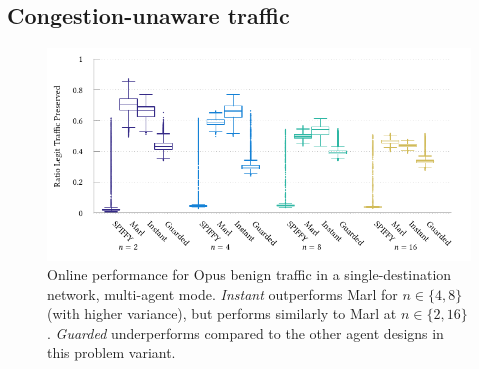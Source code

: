 \subsection{Congestion-unaware traffic}
%	
%	
\begin{figure}
	\centering
	\includegraphics[width=\linewidth]{plots/marl/tnsm-udp-box-separate-thesis}
	\caption[Online performance for Opus benign traffic in a single-destination network, multi-agent mode.]{
		Online performance for Opus benign traffic in a single-destination network, multi-agent mode.
		\emph{Instant} outperforms Marl for $n \in \{4, 8\}$ (with higher variance), but performs similarly to Marl at $n\in \{2, 16\}$.
		\emph{Guarded} underperforms compared to the other agent designs in this problem variant.
		\label{fig:udp-tree-box}
	}
\end{figure}

